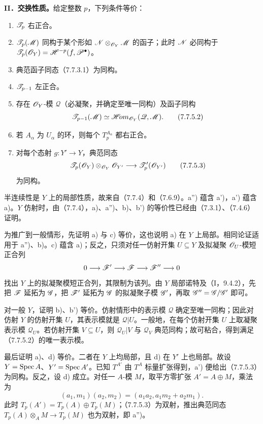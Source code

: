 \textbf{II．交换性质。}给定整数 $p$，下列条件等价：
\begin{enumerate}[label=\alph*)]
\item $\mathscr T_p$ 右正合。
\item[\textup{a')}] $\mathscr T_p(\mathscr M)$ 同构于某个形如 $\mathscr N\otimes_{\mathscr O_Y}\mathscr M$ 的函子；此时 $\mathscr N$ 必同构于 $\mathscr T_p(\mathscr O_Y)=\mathscr H^{-p}(f,\mathscr P^\bullet)$。
\item[\textup{a'')}] 典范函子同态（7.7.3.1）为同构。
\item[\textup{b)}] $\mathscr T_{p-1}$ 左正合。
\item[\textup{b')}] 存在 $\mathscr O_Y$-模 $\mathscr Q$（必凝聚，并确定至唯一同构）及函子同构
\begin{equation}
 \mathscr T_{p-1}(\mathscr M)\simeq\mathscr{H}\!om_{\mathscr O_Y}(\mathscr Q,\mathscr M).
 \tag{7.7.5.2}
\end{equation}
\item[\textup{c)}] 若 $A_\alpha$ 为 $U_\alpha$ 的环，则每个 $T_p^{A_\alpha}$ 都右正合。
\item[\textup{d)}] 对每个态射 $g:Y'\to Y$，典范同态
\begin{equation}
 \mathscr T_p(\mathscr O_Y)\otimes_{\mathscr O_Y}\mathscr O_{Y'}\longrightarrow\mathscr T'_p(\mathscr O_{Y'})
 \tag{7.7.5.3}
\end{equation}
为同构。
\end{enumerate}
半连续性是 $Y$ 上的局部性质，故来自（7.7.4）和（7.6.9）。a'') 蕴含 a')，a') 蕴含 a)。$Y$ 仿射时，由（7.7.4），a)、a'')、b)、b') 的等价性已经由（7.3.1）、（7.4.6）证明。

为推广到一般情形，先证明 a) 与 c) 等价，这也说明 a) 在 $Y$ 上局部。相同论证适用于 a'')、b)。c) 蕴含 a)；反之，只须对任一仿射开集 $U\subseteq Y$ 及拟凝聚 $\mathscr O_U$-模短正合列
\[
 0\longrightarrow\mathscr F'\longrightarrow\mathscr F\longrightarrow\mathscr F''\longrightarrow0
\]
找出 $Y$ 上的拟凝聚模短正合列，其限制为该列。由 $Y$ 局部诺特及（I，9.4.2），先把 $\mathscr F$ 延拓为 $\mathscr G$，把 $\mathscr F'$ 延拓为 $\mathscr G$ 的拟凝聚子模 $\mathscr G'$，再取 $\mathscr G''=\mathscr G/\mathscr G'$ 即可。

对一般 $Y$，证明 b)、b') 等价。仿射情形中的表示模 $\mathscr Q$ 确定至唯一同构；因此对仿射 $Y$ 的仿射开集 $U$，其表示模就是 $\mathscr Q|U$。一般地，在每个仿射开集 $U$ 上取凝聚表示模 $\mathscr Q_U$。若仿射开集 $V\subseteq U$，则 $\mathscr Q_U|V$ 与 $\mathscr Q_V$ 典范同构；故可粘合，得到满足（7.7.5.2）的唯一表示模。

最后证明 a)、d) 等价。二者在 $Y$ 上均局部，且 d) 在 $Y'$ 上也局部。故设 $Y=\operatorname{Spec} A$、$Y'=\operatorname{Spec} A'$。已知 $T^{A'}$ 由 $T^A$ 标量扩张得到，a') 便给出（7.7.5.3）为同构。反之，设 d) 成立。对任一 $A$-模 $M$，取平方零扩张 $A'=A\oplus M$，乘法为
\[
 (a_1,m_1)(a_2,m_2)=(a_1a_2,a_1m_2+a_2m_1).
\]
此时 $T_p(A')=T_p(A)\oplus T_p(M)$；（7.7.5.3）为双射，推出典范同态 $T_p(A)\otimes_A M\to T_p(M)$ 也为双射，即 a'')。

